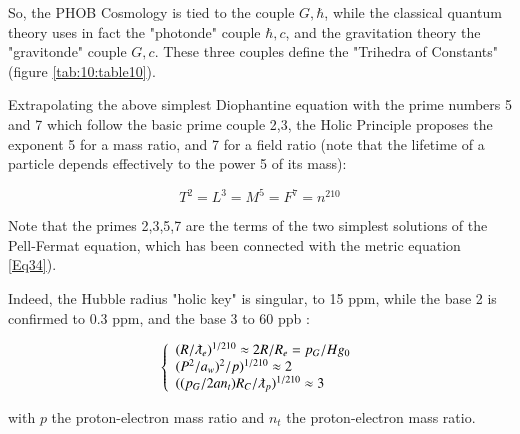 \documentclass[a4paper,9pt]{article}
\newcounter{row}
\begin{document}


So, the PHOB Cosmology is tied to the couple $G,\hbar$, while the classical quantum theory uses in fact the "photonde" couple $\hbar,c$, and the gravitation theory the "gravitonde" couple $G,c$. These three couples define the "Trihedra of Constants" (figure \ref{tab:10:table10}). 




Extrapolating the above simplest Diophantine equation with the prime numbers 5 and 7 which follow the basic prime couple 2,3, the Holic Principle proposes the exponent 5 for a mass ratio, and 7 for a field ratio (note that the lifetime of a particle depends effectively to the power 5 of its mass):

\begin{equation}\label{Eq13}
T^2 = L^3 = M^5 = F^7 = n^{210}
 \end{equation}
 
 Note that the primes 2,3,5,7 are the terms of the two simplest solutions of the Pell-Fermat equation, which has been connected with the metric equation \ref{Eq34}). 
 
 Indeed, the Hubble radius "holic key" is singular, to 15 ppm, while the base 2 is confirmed to 0.3 ppm, and the base 3 to 60 ppb :
 
 
 \begin{equation}\label{Eq14}
 \left\{
    \begin{array}{ll}
        (R/\lambdabar_e)^{1/210} \approx 2R/R_e = p_G/Hg_0 \\
    
        (P^2/a_w)^2/p)^{1/210}\approx 2\\
        
        ((p_G/2an_t) R_C/\lambdabar_p)^{1/210} \approx 3
    \end{array}
\right.
\end{equation}




with $p$ the proton-electron mass ratio and $n_t$ the proton-electron mass ratio. 
\end{document}
